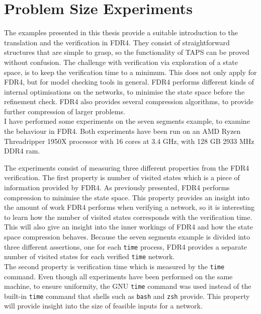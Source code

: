 \section{Problem Size Experiments}
The examples presented in this thesis provide a suitable introduction to the translation and the verification in FDR4. They consist of straightforward structures that are simple to grasp, so the functionality of TAPS can be proved without confusion.
The challenge with verification via exploration of a state space, is to keep the verification time to a minimum. This does not only apply for FDR4, but for model checking tools in general. FDR4 performs different kinds of internal optimisations on the networks, to minimise the state space before the refinement check. FDR4 also provides several compression algorithms, to provide further compression of larger problems. \\

I have performed some experiments on the seven segments example, to examine the behaviour in FDR4.
Both experiments have been run on an
AMD Ryzen Threadripper 1950X processor with 16 cores at 3.4 GHz, with 128 GB 2933 MHz DDR4 ram. %

The experiments consist of measuring three different properties from the FDR4 verification.
The first property is number of visited states which is a piece of information provided by FDR4.
As previously presented, FDR4 performs compression to minimise the state space.
This property provides an insight into the amount of work FDR4 performs when verifying a network, so it is interesting to learn how the number of visited states corresponds with the verification time. This will also give an insight into the inner workings of FDR4 and how the state space compression behaves.
Because the seven segments example is divided into three different assertions, one for each \texttt{time} process, FDR4 provides a separate number of visited states for each verified \texttt{time} network. \\

The second property is verification time which is measured by the \texttt{time} command. Even though all experiments have been performed on the same machine, to ensure uniformity, the GNU \texttt{time} command was used instead of the built-in \texttt{time} command that shells such as \texttt{bash} and \texttt{zsh} provide. This property will provide insight into the size of feasible inputs for a \cspm{} network.\\

